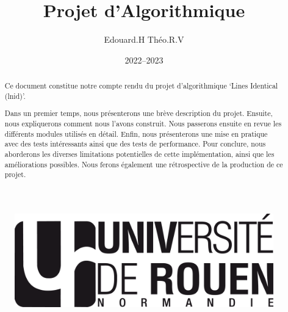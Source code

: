 \documentclass[12pt]{article}
\title{Projet d'Algorithmique}
\author{Edouard.H Théo.R.V}
\date{2022--2023}
\begin{document}
    \begin{figure}
        \includegraphics[scale=0.3, right]{logo-univ-rouen-normandie-noir.png}
    \end{figure}
    
    \maketitle

    \begin{abstract}
        Ce document constitue notre compte rendu du projet d'algorithmique 
        `Lines Identical (lnid)'.
        
        Dans un premier temps, nous présenterons une 
        brève description du projet. Ensuite, nous expliquerons comment nous 
        l'avons construit. Nous passerons ensuite en revue les différents 
        modules utilisés en détail. Enfin, nous présenterons une mise en 
        pratique avec des tests intéressants ainsi que des tests de performance.
        Pour conclure, nous aborderons les diverses limitations potentielles de 
        cette implémentation, ainsi que les améliorations possibles. Nous ferons
         également une rétrospective de la production de ce projet.
    \end{abstract}

    \newpage

    \tableofcontents

    \newpage
\end{document}
